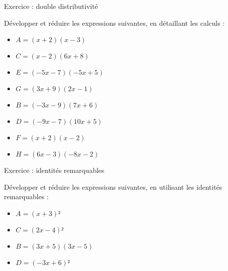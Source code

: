 \documentclass{automatisme}
\begin{document}
\begin{frame}
	\begin{center}
		\LARGE

		Exercice : double distributivité
	\end{center}
	\vspace{2em}

	Développer et réduire les expressions suivantes, en détaillant les calculs :

	\begin{multicols}{2}
		\begin{itemize}
			\item $A = (x + 2)(x - 3)$
			\item $C = (x - 2)(6x + 8)$
			\item $E = (-5x - 7)(-5x + 5)$
			\item $G = (3x + 9)(2x - 1)$
			\item $B = (-3x - 9)(7x + 6)$
			\item $D = (-9x - 7)(10x + 5)$
			\item $F = (x + 2)(x - 2)$
			\item $H = (6x - 3)(-8x - 2)$
		\end{itemize}
	\end{multicols}
\end{frame}

\begin{frame}
	\begin{center}
		\LARGE

		Exercice : identités remarquables
	\end{center}
	Développer et réduire les expressions suivantes, en utilisant les identités remarquables :
	\begin{multicols}{2}
		\begin{itemize}
			\item $A = (x + 3)²$
			\item $C = (2x - 4)²$
			\item $B = (3x + 5)(3x - 5)$
			\item $D = (-3x + 6)²$
		\end{itemize}
	\end{multicols}
\end{frame}
\end{document}
